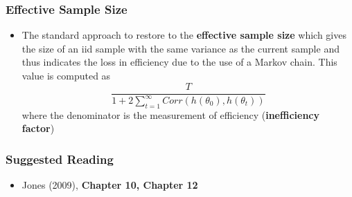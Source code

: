 \documentclass[10pt]{beamer}
\begin{document}
\begin{frame}
  \frametitle{Effective Sample Size}
  \begin{itemize}
  \item The standard approach to restore to the \textbf{effective sample size}
    which gives the size of an iid sample with the same variance as the current
    sample and thus indicates the loss in efficiency due to the use of a Markov
    chain. This value is computed as
    \begin{equation*}
      \frac{T}{1+ 2 \sum _{t=1}^{\infty} Corr(h(\theta_0),h(\theta_t))}
    \end{equation*}
    where the denominator is the measurement of efficiency
    (\textbf{inefficiency factor})

  \end{itemize}

\end{frame}


\begin{frame}
  \frametitle{Suggested Reading}

  \begin{itemize}
  \item Jones (2009), \textbf{Chapter 10, Chapter 12}



  \end{itemize}

\end{frame}
\end{document}
